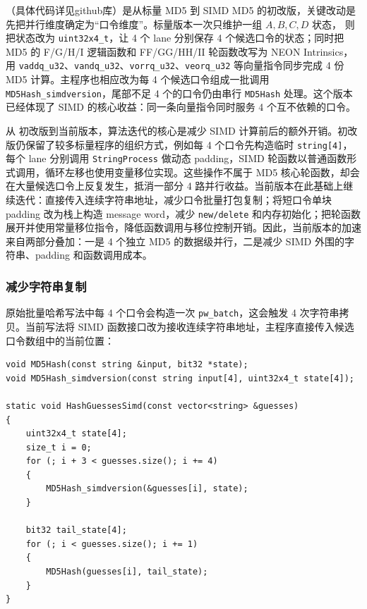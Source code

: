 \documentclass[UTF8,a4paper,12pt]{ctexart}
\begin{document}
 （具体代码详见github库）是从标量 MD5 到 SIMD MD5 的初改版，关键改动是先把并行维度确定为“口令维度”。标量版本一次只维护一组 $A,B,C,D$ 状态， 则把状态改为 \texttt{uint32x4\_t}，让 4 个 lane 分别保存 4 个候选口令的状态；同时把 MD5 的 F/G/H/I 逻辑函数和 FF/GG/HH/II 轮函数改写为 NEON Intrinsics，用 \texttt{vaddq\_u32}、\texttt{vandq\_u32}、\texttt{vorrq\_u32}、\texttt{veorq\_u32} 等向量指令同步完成 4 份 MD5 计算。主程序也相应改为每 4 个候选口令组成一批调用 \texttt{MD5Hash\_simdversion}，尾部不足 4 个的口令仍由串行 \texttt{MD5Hash} 处理。这个版本已经体现了 SIMD 的核心收益：同一条向量指令同时服务 4 个互不依赖的口令。

从  初改版到当前版本，算法迭代的核心是减少 SIMD 计算前后的额外开销。初改版仍保留了较多标量程序的组织方式，例如每 4 个口令先构造临时 \texttt{string[4]}，每个 lane 分别调用 \texttt{StringProcess} 做动态 padding，SIMD 轮函数以普通函数形式调用，循环左移也使用变量移位实现。这些操作不属于 MD5 核心轮函数，却会在大量候选口令上反复发生，抵消一部分 4 路并行收益。当前版本在此基础上继续迭代：直接传入连续字符串地址，减少口令批量打包复制；将短口令单块 padding 改为栈上构造 message word，减少 \texttt{new/delete} 和内存初始化；把轮函数展开并使用常量移位指令，降低函数调用与移位控制开销。因此，当前版本的加速来自两部分叠加：一是 4 个独立 MD5 的数据级并行，二是减少 SIMD 外围的字符串、padding 和函数调用成本。

\subsubsection{减少字符串复制}

原始批量哈希写法中每 4 个口令会构造一次 \texttt{pw\_batch}，这会触发 4 次字符串拷贝。当前写法将 SIMD 函数接口改为接收连续字符串地址，主程序直接传入候选口令数组中的当前位置：

\begin{lstlisting}[style=cppstyle,caption={避免 string 批量复制}]
void MD5Hash(const string &input, bit32 *state);
void MD5Hash_simdversion(const string input[4], uint32x4_t state[4]);

static void HashGuessesSimd(const vector<string> &guesses)
{
    uint32x4_t state[4];
    size_t i = 0;
    for (; i + 3 < guesses.size(); i += 4)
    {
        MD5Hash_simdversion(&guesses[i], state);
    }

    bit32 tail_state[4];
    for (; i < guesses.size(); i += 1)
    {
        MD5Hash(guesses[i], tail_state);
    }
}
\end{lstlisting}
\end{document}

